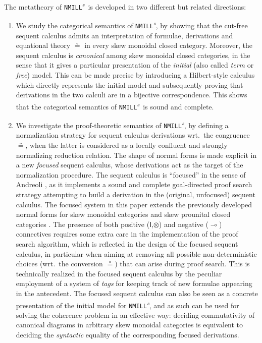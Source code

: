 \documentclass[copyright,creativecommons]{eptcs}
\theoremstyle{definition}
\newcommand{\ot}{\otimes}
\newcommand{\lolli}{\multimap}
\newcommand{\I}{\mathsf{I}}
\newcommand{\NMILL}{\texttt{NMILL}}
\newcommand{\SkNMILL}{\NMILL\textsuperscript{\textit{s}}}
\begin{document}
The metatheory of \SkNMILL\ is developed in two different but related directions:
\begin{enumerate}[($i$)]
  \item We study the categorical semantics of \SkNMILL, by showing that the cut-free sequent calculus admits an interpretation of formulae, derivations and equational theory $\circeq$ in every skew monoidal closed category. Moreover, the sequent calculus is \emph{canonical} among skew monoidal closed categories, in the sense that it gives a particular presentation of the \emph{initial} (also called \emph{term} or \emph{free}) model. This can be made precise by introducing a Hilbert-style calculus which directly represents the initial model and subsequently proving that derivations in the two calculi are in a bijective correspondence.
This shows that the categorical semantics of \SkNMILL\ is sound and
complete.

\item We investigate the proof-theoretic semantics of \SkNMILL, by defining a normalization strategy for sequent calculus derivations wrt.\ the congruence $\circeq$, when the latter is considered as a locally confluent and strongly normalizing reduction relation. The shape of normal forms is made explicit in a new \emph{focused} sequent calculus, whose derivations act as the target of the normalization procedure. The sequent calculus is ``focused'' in the sense of Andreoli \cite{andreoli:logic:1992}, as it implements a sound and complete goal-directed proof search strategy attempting to build a derivation in the (original, unfocused) sequent calculus. The focused system in this paper extends the previously
developed normal forms for skew monoidal categories \cite{uustalu:sequent:2021} and skew prounital closed categories \cite{uustalu:deductive:nodate}. The presence of both positive ($\I$,$\ot$) and negative ($\lolli$) connectives requires some extra care in the implementation of the proof search algorithm, which is reflected in the design of the focused sequent calculus, in particular when aiming at removing all possible non-deterministic choices (wrt.\ the conversion $\circeq$) that can arise during proof search. This is technically realized in the focused sequent calculus by the peculiar employment of a system of \emph{tags} for keeping track of new formulae appearing in the antecedent. The focused sequent calculus can also be seen as a concrete presentation of the initial model for \SkNMILL, and as such can be used for solving the coherence problem in an effective way: deciding commutativity of canonical diagrams in arbitrary skew monoidal categories is equivalent to deciding the \emph{syntactic} equality of the corresponding focused derivations.
\end{enumerate}
\end{document}
